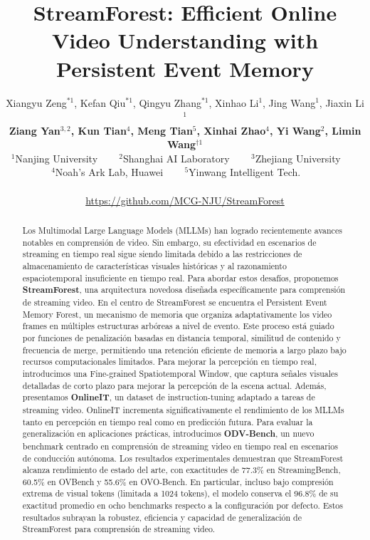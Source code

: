\documentclass{article}
\title{StreamForest: Efficient Online Video Understanding with Persistent Event Memory}
\author{Xiangyu Zeng$^{*1}$, Kefan Qiu$^{*1}$, Qingyu Zhang$^{*1}$, Xinhao Li$^{1}$, Jing Wang$^{1}$, Jiaxin Li$^{1}$ \\
\textbf{Ziang Yan$^{3,2}$, Kun Tian$^{4}$, Meng Tian$^{5}$, Xinhai Zhao$^{4}$, Yi Wang$^{2}$, Limin Wang$^{\dagger1}$} \\
\small$^1$Nanjing University ~~~ 
\small$^2$Shanghai AI Laboratory ~~~
\small$^3$Zhejiang University ~~~  \\
\small$^4$Noah's Ark Lab, Huawei ~~~
\small$^5$Yinwang Intelligent Tech. ~~~ \\
\\
{\small \url{https://github.com/MCG-NJU/StreamForest}}
}
\begin{document}
\maketitle

\renewcommand{\thefootnote}{}

\begin{abstract}
Los Multimodal Large Language Models (MLLMs) han logrado recientemente avances notables en comprensión de video. Sin embargo, su efectividad en escenarios de streaming en tiempo real sigue siendo limitada debido a las restricciones de almacenamiento de características visuales históricas y al razonamiento espaciotemporal insuficiente en tiempo real. Para abordar estos desafíos, proponemos \textbf{StreamForest}, una arquitectura novedosa diseñada específicamente para comprensión de streaming video. En el centro de StreamForest se encuentra el Persistent Event Memory Forest, un mecanismo de memoria que organiza adaptativamente los video frames en múltiples estructuras arbóreas a nivel de evento. Este proceso está guiado por funciones de penalización basadas en distancia temporal, similitud de contenido y frecuencia de merge, permitiendo una retención eficiente de memoria a largo plazo bajo recursos computacionales limitados. Para mejorar la percepción en tiempo real, introducimos una Fine-grained Spatiotemporal Window, que captura señales visuales detalladas de corto plazo para mejorar la percepción de la escena actual. Además, presentamos \textbf{OnlineIT}, un dataset de instruction-tuning adaptado a tareas de streaming video. OnlineIT incrementa significativamente el rendimiento de los MLLMs tanto en percepción en tiempo real como en predicción futura. Para evaluar la generalización en aplicaciones prácticas, introducimos \textbf{ODV-Bench}, un nuevo benchmark centrado en comprensión de streaming video en tiempo real en escenarios de conducción autónoma. Los resultados experimentales demuestran que StreamForest alcanza rendimiento de estado del arte, con exactitudes de 77.3\% en StreamingBench, 60.5\% en OVBench y 55.6\% en OVO-Bench. En particular, incluso bajo compresión extrema de visual tokens (limitada a 1024 tokens), el modelo conserva el 96.8\% de su exactitud promedio en ocho benchmarks respecto a la configuración por defecto. Estos resultados subrayan la robustez, eficiencia y capacidad de generalización de StreamForest para comprensión de streaming video.
\end{abstract}
\end{document}
